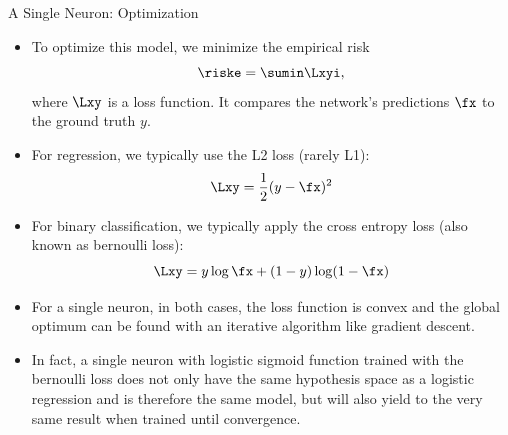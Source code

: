 \begin{vbframe} {A Single Neuron: Optimization}
\begin{itemize}
\item To optimize this model, we minimize the empirical risk 
$$\riske = \sumin \Lxyi,$$
where $\Lxy$ is a loss function. It compares the network's predictions $\fx$ to the ground truth $y$. 
\item For regression, we typically use the L2 loss (rarely L1): $$\Lxy = \frac{1}{2}(y - \fx)^2$$
\item For binary classification, we typically apply the cross entropy loss (also known as bernoulli loss): $$\Lxy = y \log \fx + (1 - y) \log(1 - \fx)$$
\framebreak 

\vspace{.5cm}
\item For a single neuron, in both cases, the loss function is convex and the global optimum can be found with an iterative algorithm like gradient descent. 
\vspace{1cm}
\item In fact, a single neuron with logistic sigmoid function trained with the bernoulli loss does not only have the same hypothesis space as a logistic regression and is therefore the same model, but will also yield to the very same result when trained until convergence.
\end{itemize}
\end{vbframe} 

\endlecture
